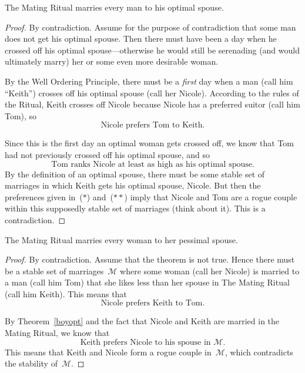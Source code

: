 \begin{theorem}\label{boyopt}
The Mating Ritual marries every man to his optimal spouse.
\end{theorem}

\begin{proof}
By contradiction.  Assume for the purpose of contradiction that some
man does not get his optimal spouse.  Then there must have been a day
when he crossed off his optimal spouse---otherwise he would still be
serenading (and would ultimately marry) her or some even more
desirable woman.

By the Well Ordering Principle, there must be a \emph{first} day when
a man (call him ``Keith'') crosses off his optimal spouse (call her
Nicole).
According to the rules of the Ritual, Keith crosses off Nicole because
Nicole has a preferred suitor (call him Tom), so
\begin{equation}
\text{Nicole prefers Tom to Keith.} \tag{$*$}
\end{equation}

Since this is the first day an optimal woman gets crossed off, we know
that Tom had not previously crossed off his optimal spouse, and so
\begin{equation}\tag{$**$}
\text{Tom ranks Nicole at least as high as his optimal spouse.}
\end{equation}
By the definition of an optimal spouse, there must be some stable set
of marriages in which Keith gets his optimal spouse, Nicole.  But then
the preferences given in~($*$) and~($**$) imply that Nicole and Tom
are a rogue couple within this supposedly stable set of marriages
(think about it).  This is a contradiction.
\end{proof}

\begin{theorem}
The Mating Ritual marries every woman to her pessimal spouse.
\end{theorem}

\begin{proof}
By contradiction.  Assume that the theorem is not true.  Hence there
must be a stable set of marriages~$\mathcal{M}$ where some woman (call
her Nicole) is married to a man (call him Tom) that she likes less
than her spouse in The Mating Ritual (call him Keith).  This means
that
\begin{equation}
\text{Nicole prefers Keith to Tom.} \tag{+}
\end{equation}

By Theorem~\ref{boyopt} and the fact that Nicole and Keith are married
in the Mating Ritual, we know that 
\begin{equation}\tag{++}
\text{Keith prefers Nicole to his spouse in~$\mathcal{M}$.}
\end{equation}
This means that Keith and Nicole form a rogue couple in~$\mathcal{M}$,
which contradicts the stability of~$\mathcal{M}$.
\end{proof}

